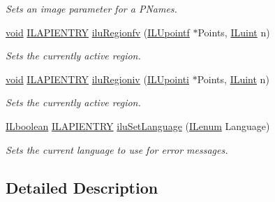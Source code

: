 \begin{DoxyCompactItemize}
\begin{DoxyCompactList}\small\item\em Sets an image parameter for a {\itshape P\+Names}. \end{DoxyCompactList}\item 
\hyperlink{_i_l_8h_a5530e04d947bcddd83639ea7940faf10}{void} \hyperlink{_i_l_8h_a69c08a8d06df986f7e46f209d131ef2f}{I\+L\+A\+P\+I\+E\+N\+T\+R\+Y} \hyperlink{group__ilu__state_gaa26c0daed6573bf4a1c8f8146de2dbfc}{ilu\+Regionfv} (\hyperlink{struct_i_l_upointf}{I\+L\+Upointf} $\ast$Points, \hyperlink{group__il__types_gaff8e86a1072c8d7cfe387fb87c6ed8e1}{I\+Luint} n)
\begin{DoxyCompactList}\small\item\em Sets the currently active region. \end{DoxyCompactList}\item 
\hyperlink{_i_l_8h_a5530e04d947bcddd83639ea7940faf10}{void} \hyperlink{_i_l_8h_a69c08a8d06df986f7e46f209d131ef2f}{I\+L\+A\+P\+I\+E\+N\+T\+R\+Y} \hyperlink{group__ilu__state_gaf22304a1fa0728ee5fadf4d92effdb50}{ilu\+Regioniv} (\hyperlink{struct_i_l_upointi}{I\+L\+Upointi} $\ast$Points, \hyperlink{group__il__types_gaff8e86a1072c8d7cfe387fb87c6ed8e1}{I\+Luint} n)
\begin{DoxyCompactList}\small\item\em Sets the currently active region. \end{DoxyCompactList}\item 
\hyperlink{group__il__types_gaa6aa7c95cfdc06b4d8601ef832b7bb0a}{I\+Lboolean} \hyperlink{_i_l_8h_a69c08a8d06df986f7e46f209d131ef2f}{I\+L\+A\+P\+I\+E\+N\+T\+R\+Y} \hyperlink{group__ilu__state_ga4c2e7c06c4a5677dbe58cba9c5ed075e}{ilu\+Set\+Language} (\hyperlink{group__il__types_ga62ca73445716183ef42b1f3906a45ed0}{I\+Lenum} Language)
\begin{DoxyCompactList}\small\item\em Sets the current language to use for error messages. \end{DoxyCompactList}\end{DoxyCompactItemize}


\subsection{Detailed Description}


